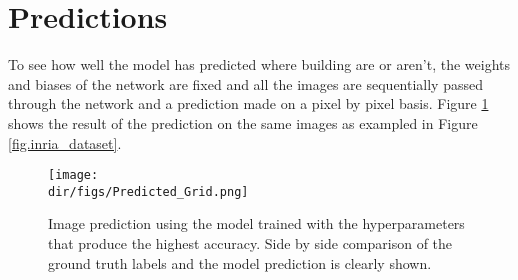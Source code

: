 \section{Predictions}
To see how well the model has predicted where building are or aren't, the weights and biases of the network are fixed and all the images are sequentially passed through the network and a prediction made on a pixel by pixel basis. Figure \ref{fig.prediction} shows the result of the prediction on the same images as exampled in Figure \ref{fig.inria_dataset}. 

\begin{figure}[htpb]
    \centering
    \texttt{[image: \\dir/figs/Predicted\_Grid.png]}
    \caption[Image Prediction using the model with the best accuracy]{Image prediction using the model trained with the hyperparameters that produce the highest accuracy. Side by side comparison of the ground truth labels and the model prediction is clearly shown.}
    \label{fig.prediction}
\end{figure}